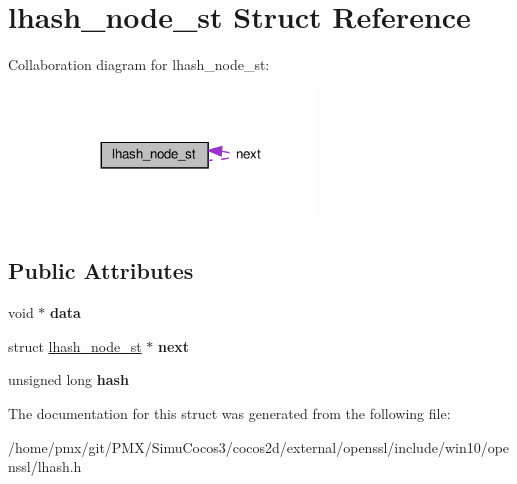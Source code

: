 \hypertarget{structlhash__node__st}{}\section{lhash\+\_\+node\+\_\+st Struct Reference}
\label{structlhash__node__st}


Collaboration diagram for lhash\+\_\+node\+\_\+st\+:
\nopagebreak
\begin{figure}[H]
\begin{center}
\leavevmode
\includegraphics[width=200pt]{structlhash__node__st__coll__graph}
\end{center}
\end{figure}
\subsection*{Public Attributes}
\begin{DoxyCompactItemize}
\item 
\mbox{\label{structlhash__node__st_a1bddfe54547a8c35edc658730d8edcb7}} 
void $\ast$ {\bfseries data}
\item 
\mbox{\label{structlhash__node__st_a9756db4182d64ae6212672d2d1cea695}} 
struct \hyperlink{structlhash__node__st}{lhash\+\_\+node\+\_\+st} $\ast$ {\bfseries next}
\item 
\mbox{\label{structlhash__node__st_adae3442cad55dbd25659909f8f15ced7}} 
unsigned long {\bfseries hash}
\end{DoxyCompactItemize}


The documentation for this struct was generated from the following file\+:\begin{DoxyCompactItemize}
\item 
/home/pmx/git/\+P\+M\+X/\+Simu\+Cocos3/cocos2d/external/openssl/include/win10/openssl/lhash.\+h\end{DoxyCompactItemize}

